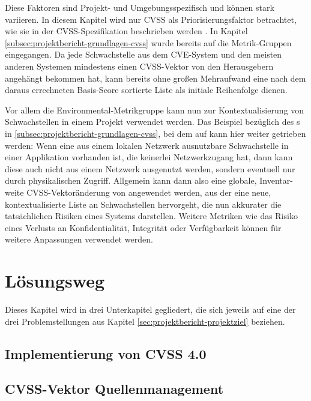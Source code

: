 Diese Faktoren sind Projekt- und Umgebungsspezifisch und können stark variieren.
In diesem Kapitel wird nur CVSS als Priorisierungsfaktor betrachtet, wie sie in der CVSS-Spezifikation beschrieben werden .
In Kapitel \ref{subsec:projektbericht-grundlagen-cvss} wurde bereits auf die Metrik-Gruppen eingegangen.
Da jede Schwachstelle aus dem CVE-System und den meisten anderen Systemen mindestens einen CVSS-Vektor von den Herausgebern angehängt bekommen hat, kann bereits ohne großen Mehraufwand eine nach dem daraus errechneten Basis-Score sortierte Liste als initiale Reihenfolge dienen.

Vor allem die Environmental-Metrikgruppe kann nun zur Kontextualisierung von Schwachstellen in einem Projekt verwendet werden.
Das Beispiel bezüglich des s in \ref{subsec:projektbericht-grundlagen-cvss}, bei dem  auf  kann hier weiter getrieben werden:
Wenn eine aus einem lokalen Netzwerk ausnutzbare Schwachstelle in einer Applikation vorhanden ist, die keinerlei Netzwerkzugang hat, dann kann diese auch nicht aus einem Netzwerk ausgenutzt werden, sondern eventuell nur durch physikalischen Zugriff.
Allgemein kann dann also eine globale, Inventar-weite CVSS-Vektoränderung von  angewendet werden, aus der eine neue, kontextualisierte Liste an Schwachstellen hervorgeht, die nun akkurater die tatsächlichen Risiken eines Systems darstellen.
Weitere Metriken wie das Risiko eines Verlusts an Konfidentialität, Integrität oder Verfügbarkeit können für weitere Anpassungen verwendet werden.




\section{Lösungsweg} \label{sec:projektbericht-loesungsweg}

Dieses Kapitel wird in drei Unterkapitel gegliedert, die sich jeweils auf eine der drei Problemstellungen aus Kapitel \ref{sec:projektbericht-projektziel} beziehen.

\subsection{Implementierung von CVSS 4.0} \label{subsec:projektbericht-loesungsweg-cvss-4-implementierung}

\subsection{CVSS-Vektor Quellenmanagement} \label{subsec:projektbericht-loesungsweg-cvss-source-management}

